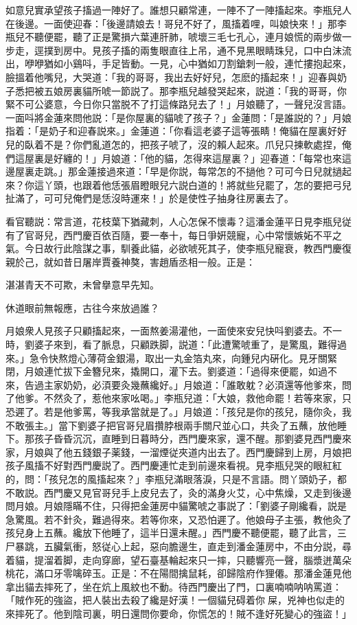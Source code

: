 如意兒實承望孩子搐過一陣好了。誰想只顧常連，一陣不了一陣搐起來。李瓶兒人在後邊。一面使迎春：「後邊請娘去！哥兒不好了，風搐着哩，叫娘快來！」那李瓶兒不聽便罷，聽了正是驚損六葉連肝肺，唬壞三毛七孔心，連月娘慌的兩步做一步走，逕撲到房中。見孩子搐的兩隻眼直往上吊，通不見黑眼睛珠兒，口中白沫流出，咿咿猶如小鷄呌，手足皆動。一見，心中猶如刀割鎗刺一般，連忙摟抱起來，臉搵着他嘴兒，大哭道：「我的哥哥，我出去好好兒，怎麽的搐起來！」迎春與奶子悉把被五娘房裏貓所唬一節説了。那李瓶兒越發哭起來，説道：「我的哥哥，你緊不可公婆意，今日你只當脱不了打這條路兒去了！」月娘聽了，一聲兒沒言語。一面呌將金蓮來問他説：「是你屋裏的貓唬了孩子？」金蓮問：「是誰説的？」月娘指着：「是奶子和迎春説來。」金蓮道：「你看這老婆子這等張睛！俺貓在屋裏好好兒的臥着不是？你們亂道怎的，把孩子唬了，沒的賴人起來。爪兒只揀軟處捏，俺們這屋裏是好纏的！」月娘道：「他的貓，怎得來這屋裏？」迎春道：「每常也來這邊屋裏走跳。」那金蓮接過來道：「早是你説，每常怎的不撾他？可可今日兒就撾起來？你這丫頭，也跟着他恁張眉瞪眼兒六説白道的！將就些兒罷了，怎的要把弓兒扯滿了，可可兒俺們是恁沒時運來！」於是使性子抽身往房裏去了。

看官聽説：常言道，花枝葉下猶藏刺，人心怎保不懷毒？這潘金蓮平日見李瓶兒従有了官哥兒，西門慶百依百隨，要一奉十，每日爭姸競寵，心中常懷嫉妬不平之氣。今日故行此陰謀之事，馴養此貓，必欲唬死其子，使李瓶兒寵衰，教西門慶復親於己，就如昔日屠岸賈養神獒，害趙盾丞相一般。正是：

\begin{myquote}
湛湛青天不可欺，未曾擧意早先知。

休道眼前無報應，古往今來放過誰？
\end{myquote}

月娘衆人見孩子只顧搐起來，一面熬姜湯灌他，一面使來安兒快呌劉婆去。不一時，劉婆子來到，看了脈息，只顧跌脚，説道：「此遭驚唬重了，是驚風，難得過來。」急令快熬燈心薄荷金銀湯，取出一丸金箔丸來，向鍾兒内硏化。見牙關緊閉，月娘連忙拔下金簪兒來，撬開口，灌下去。劉婆道：「過得來便罷，如過不來，告過主家奶奶，必湏要灸幾蘸纔好。」月娘道：「誰敢躭？必湏還等他爹來，問了他爹。不然灸了，惹他來家吆喝。」李瓶兒道：「大娘，救他命罷！若等來家，只恐遲了。若是他爹罵，等我承當就是了。」月娘道：「孩兒是你的孩兒，隨你灸，我不敢張主。」當下劉婆子把官哥兒眉攢脖根兩手關尺並心口，共灸了五蘸，放他睡下。那孩子昏昏沉沉，直睡到日暮時分，西門慶來家，還不醒。那劉婆見西門慶來家，月娘與了他五錢銀子薬錢，一溜煙従夾道内出去了。西門慶歸到上房，月娘把孩子風搐不好對西門慶説了。西門慶連忙走到前邊來看視。見李瓶兒哭的眼紅紅的，問：「孩兒怎的風搐起來？」李瓶兒滿眼落淚，只是不言語。問丫頭奶子，都不敢説。西門慶又見官哥兒手上皮兒去了，灸的滿身火艾，心中焦燥，又走到後邊問月娘。月娘隱瞞不住，只得把金蓮房中貓驚唬之事説了：「劉婆子剛纔看，説是急驚風。若不針灸，難過得來。若等你來，又恐怕遲了。他娘母子主張，教他灸了孩兒身上五蘸。纔放下他睡了，這半日還未醒。」西門慶不聽便罷，聽了此言，三尸暴跳，五臟氣衝，怒従心上起，惡向膽邊生，直走到潘金蓮房中，不由分説，尋着貓，提溜着脚，走向穿廊，望石臺基輪起來只一摔，只聽響亮一聲，腦漿迸萬朵桃花，滿口牙零噙碎玉。正是：不在陽間擒鼠耗，卻歸陰府作狸僊。那潘金蓮見他拿出貓去摔死了，坐在炕上風紋也不動。待西門慶出了門，口裏喃喃呐呐罵道：「賊作死的強盜，把人裝出去殺了纔是好漢！一個貓兒碍着你𠳹屎，兇神也似走的來摔死了。他到陰司裏，明日還問你要命，你慌怎的！賊不逢好死變心的強盜！」

